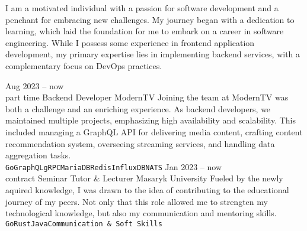 \documentclass[9pt]{cv}
\begin{document}
\begin{minipage}[t]{0.4\textwidth} %
	\vspace{-\baselineskip} %
	
	I am a motivated individual with a passion for software development and a penchant for embracing new challenges. My journey began with a dedication to learning, which laid the foundation for me to embark on a career in software engineering. While I possess some experience in frontend application development, my primary expertise lies in implementing backend services, with a complementary focus on DevOps practices.
\end{minipage}
\hfill %
\begin{minipage}[t]{0.5\textwidth} %
	\vspace{-\baselineskip} %
	\begin{barchart}{5.5}
	\end{barchart}
\end{minipage}

\begin{center}
\end{center}


\begin{entrylist}
	\entry
		{Aug 2023 -- now\\\footnotesize{part time}}
		{Backend Developer}
		{ModernTV}
		{Joining the team at ModernTV was both a challenge and an enriching experience. As backend developers, we maintained multiple projects, emphasizing high availability and scalability. This included managing a GraphQL API for delivering media content, crafting content recommendation system, overseeing streaming services, and handling data aggregation tasks.\\ \texttt{Go}\slashsep\texttt{GraphQL}\slashsep\texttt{gRPC}\slashsep\texttt{MariaDB}\slashsep\texttt{Redis}\slashsep\texttt{InfluxDB}\slashsep\texttt{NATS}}
	\entry
		{Jan 2023 -- now\\\footnotesize{contract}}
        {Seminar Tutor \& Lecturer}
		{Masaryk University}
		{Fueled by the newly aquired knowledge, I was drawn to the idea of contributing to the educational journey of my peers. Not only that this role allowed me to strengten my technological knowledge, but also my communication and mentoring skills.\\ \texttt{Go}\slashsep\texttt{Rust}\slashsep\texttt{Java}\slashsep\texttt{Communication \& Soft Skills}}
\end{entrylist}
\end{document}
